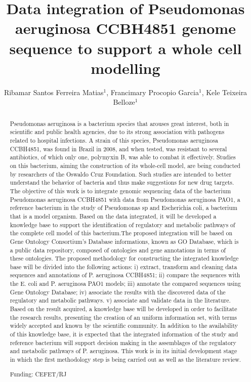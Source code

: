 \documentclass[twoside]{article}
\title{\vspace{-15mm}\fontsize{24pt}{10pt}\selectfont\textbf{Data integration of Pseudomonas aeruginosa CCBH4851 genome sequence to support a whole cell modelling}} %
\author{Ribamar Santos Ferreira Matias$^1$, Francimary Procopio Garcia$^1$, Kele Teixeira Belloze$^1$}
\affil{1 CEFET/RJ\\ }
\date{}
\begin{document}
\maketitle %

\thispagestyle{fancy} %


\begin{abstract}
Pseudomonas aeruginosa is a bacterium species that arouses great interest, both in scientific and public health agencies, due to its strong association with pathogens related to hospital infections. A strain of this species, Pseudomonas aeruginosa CCBH4851, was found in Brazil in 2008, and when tested, was resistant to several antibiotics, of which only one, polymyxin B, was able to combat it effectively. Studies on this bacterium, aiming the construction of its whole-cell model, are being conducted by researchers of the Oswaldo Cruz Foundation. Such studies are intended to better understand the behavior of bacteria and thus make suggestions for new drug targets. The objective of this work is to integrate genomic sequencing data of the bacterium Pseudomonas aeruginosa CCBH4851 with data from Pseudomonas aeruginosa PAO1, a reference bacterium in the study of Pseudomonas sp and Escherichia coli, a bacterium that is a model organism. Based on the data integrated, it will be developed a knowledge base to support the identification of regulatory and metabolic pathways of the complete cell model of this bacterium.The proposed integration will be based on Gene Ontology Consortium's Database informations, known as GO Database, which is a public data repository, composed of ontologies and gene annotations in terms of these ontologies. The proposed methodology for constructing the integrated knowledge base will be divided into the following actions: i) extract, transform and cleaning data sequences and annotations of P. aeruginosa CCBH4851; ii) compare the sequences with the E. coli and P. aeruginosa PAO1 models; iii) annotate the compared sequences using Gene Ontology Database; iv) associate the results with the discovered data of the regulatory and metabolic pathways. v) associate and validate data in the literature. Based on the result acquired, a knowledge base will be developed in order to facilitate the research results, presenting the creation of an uniform information set, with terms widely accepted and known by the scientific community. In addition to the availability of this knowledge base, it is expected that the integrated information of the study and reference bacterium will support decision making in the assemblages of the regulatory and metabolic pathways of P. aeruginosa. This work is in its initial development stage in which the first methodology step is being carried out as well as the literature review.

Funding: CEFET/RJ
\end{abstract}
\end{document}
